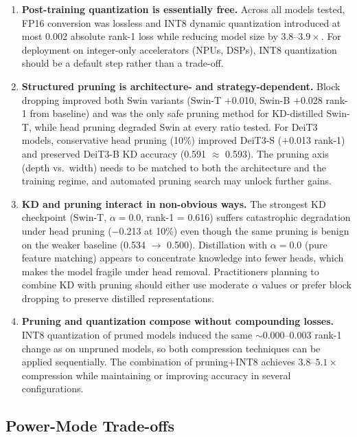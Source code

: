 \documentclass[runningheads,a4paper]{llncs}
\begin{document}
\begin{enumerate}
    \item \textbf{Post-training quantization is essentially free.} Across all models tested, FP16 conversion was lossless and INT8 dynamic quantization introduced at most 0.002 absolute rank-1 loss while reducing model size by $3.8$--$3.9\times$. For deployment on integer-only accelerators (NPUs, DSPs), INT8 quantization should be a default step rather than a trade-off.

    \item \textbf{Structured pruning is architecture- and strategy-dependent.} Block dropping improved both Swin variants (Swin-T $+$0.010, Swin-B $+$0.028 rank-1 from baseline) and was the only safe pruning method for KD-distilled Swin-T, while head pruning degraded Swin at every ratio tested. For DeiT3 models, conservative head pruning (10\%) improved DeiT3-S ($+$0.013 rank-1) and preserved DeiT3-B KD accuracy (0.591 $\approx$ 0.593). The pruning axis (depth vs.\ width) needs to be matched to both the architecture and the training regime, and automated pruning search may unlock further gains.

    \item \textbf{KD and pruning interact in non-obvious ways.} The strongest KD checkpoint (Swin-T, $\alpha{=}0.0$, rank-1 = 0.616) suffers catastrophic degradation under head pruning ($-$0.213 at 10\%) even though the same pruning is benign on the weaker baseline (0.534 $\to$ 0.500). Distillation with $\alpha{=}0.0$ (pure feature matching) appears to concentrate knowledge into fewer heads, which makes the model fragile under head removal. Practitioners planning to combine KD with pruning should either use moderate $\alpha$ values or prefer block dropping to preserve distilled representations.

    \item \textbf{Pruning and quantization compose without compounding losses.} INT8 quantization of pruned models induced the same $\sim$0.000--0.003 rank-1 change as on unpruned models, so both compression techniques can be applied sequentially. The combination of pruning$+$INT8 achieves $3.8$--$5.1\times$ compression while maintaining or improving accuracy in several configurations.
\end{enumerate}

\subsection{Power-Mode Trade-offs}\label{sec:power-modes}
\end{document}
